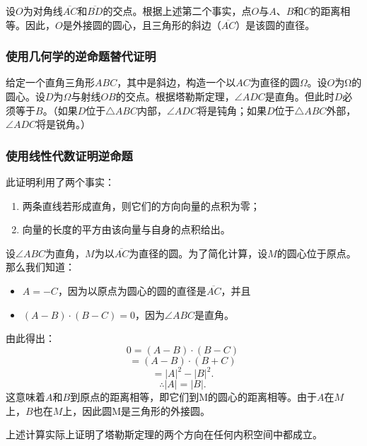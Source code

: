 设\(O\)为对角线\(\overline{AC}\)和\(\overline{BD}\)的交点。根据上述第二个事实，点\(O\)与\(A\)、\(B\)和\(C\)的距离相等。因此，\(O\)是外接圆的圆心，且三角形的斜边（\(\overline{AC}\)）是该圆的直径。
\subsubsection{使用几何学的逆命题替代证明} 
给定一个直角三角形\(ABC\)，其中是斜边，构造一个以\(AC\)为直径的圆\(\Omega\)。设\(O\)为Ω的圆心。设\(D\)为\(\Omega\)与射线\(OB\)的交点。根据塔勒斯定理，\(\angle ADC\)是直角。但此时\(D\)必须等于\(B\)。（如果\(D\)位于\(\triangle ABC\)内部，\(\angle ADC\)将是钝角；如果\(D\)位于\(\triangle ABC\)外部，\(\angle ADC\)将是锐角。）
\subsubsection{使用线性代数证明逆命题 } 
此证明利用了两个事实：
\begin{enumerate}
\item 两条直线若形成直角，则它们的方向向量的点积为零；
\item 向量的长度的平方由该向量与自身的点积给出。
\end{enumerate}
设\(\angle ABC\)为直角，\(M\)为以\(\overline{AC}\)为直径的圆。为了简化计算，设\(M\)的圆心位于原点。那么我们知道：
\begin{itemize}
\item \(A = -C\)，因为以原点为圆心的圆的直径是\(\overline{AC}\)，并且  
\item \((A - B) \cdot (B - C) = 0\)，因为\(\angle ABC\)是直角。
\end{itemize}
由此得出：
\[
0 = (A - B) \cdot (B - C)~
\]
\[
= (A - B) \cdot (B + C)~
\]
\[
= |A|^2 - |B|^2.~
\]
\[
\therefore |A| = |B|.~
\]
这意味着\(A\)和\(B\)到原点的距离相等，即它们到M的圆心的距离相等。由于\(A\)在\(M\)上，\( B\)也在\(M\)上，因此圆M是三角形的外接圆。

上述计算实际上证明了塔勒斯定理的两个方向在任何内积空间中都成立。